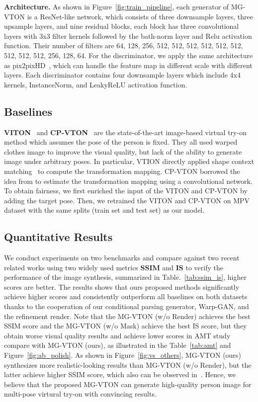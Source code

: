 \documentclass[10pt,twocolumn,letterpaper]{article}
\begin{document}
\textbf{Architecture.}
As shown in Figure~\ref{fig:train_pipeline}, each generator of MG-VTON is a ResNet-like network, which consists of three downsample layers, three upsample layers, and nine residual blocks, each block has three convolutional layers with 3x3 filter kernels followed by the bath-norm layer and Relu activation function. Their number of filters are 64, 128, 256, 512, 512, 512, 512, 512, 512, 512, 512, 512, 256, 128, 64. For the discriminator, we apply the same architecture as pix2pixHD~\cite{wang2017pix2pixHD}, which can handle the feature map in different scale with different layers. Each discriminator contains four downsample layers which include 4x4 kernels, InstanceNorm, and LeakyReLU activation function. 

\subsection{Baselines}
\textbf{VITON}~\cite{han2017viton} and \textbf{CP-VTON}~\cite{wang2018cpvton} are the state-of-the-art image-based virtual try-on method which assumes the pose of the person is fixed. They all used warped clothes image to improve the visual quality, but lack of the ability to generate image under arbitrary poses. In particular, VTION directly applied shape context matching~\cite{belongie2002shape} to compute the transformation mapping. CP-VTON borrowed the idea from \cite{Rocco2017geocnn} to estimate the transformation mapping using a convolutional network. To obtain fairness, we first enriched the input of the VITON and CP-VTON by adding the target pose. Then, we retrained the VITON and CP-VTON on MPV dataset with the same splits (train set and test set) as our model.


\subsection{Quantitative Results}
We conduct experiments on two benchmarks and compare against two recent related works using two widely used metrics \textbf{SSIM} and \textbf{IS} to verify the performance of the image synthesis, summarized in Table.~\ref{tab:ssim_is}, higher scores are better. The results shows that ours proposed methods significantly achieve higher scores and consistently outperform all baselines on both datasets thanks to the cooperation of our conditional parsing generator, Warp-GAN, and the refinement render. Note that the MG-VTON (w/o Render) achieves the best SSIM score and the MG-VTON (w/o Mask) achieve the best IS score, but they obtain worse visual quality results and achieve lower scores in AMT study compare with MG-VTON (ours), as illustrated in the Table~\ref{tab:amt} and Figure~\ref{fig:ab_polish}. As shown in Figure~\ref{fig:vs_others}, MG-VTON (ours) synthesizes more realistic-looking results than MG-VTON (w/o Render), but the latter achieve higher SSIM score, which also can be observed in~\cite{johnson2016perceptual}. Hence, we believe that the proposed MG-VTON can generate high-quality person image for multi-pose virtural try-on with convincing results.
\end{document}
